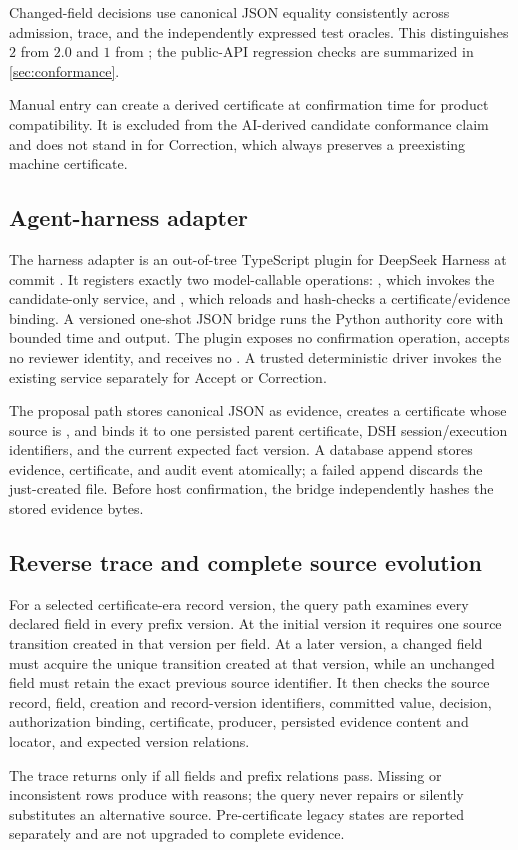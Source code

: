Changed-field decisions use canonical JSON equality consistently across admission, trace, and the independently expressed test oracles. This distinguishes $2$ from $2.0$ and $1$ from ; the public-API regression checks are summarized in \cref{sec:conformance}.

Manual entry can create a derived certificate at confirmation time for product compatibility. It is excluded from the AI-derived candidate conformance claim and does not stand in for Correction, which always preserves a preexisting machine certificate.

\subsection{Agent-harness adapter}

The harness adapter is an out-of-tree TypeScript plugin for DeepSeek Harness  at commit . It registers exactly two model-callable operations: , which invokes the candidate-only service, and , which reloads and hash-checks a certificate/evidence binding. A versioned one-shot JSON bridge runs the Python authority core with bounded time and output. The plugin exposes no confirmation operation, accepts no reviewer identity, and receives no . A trusted deterministic driver invokes the existing  service separately for Accept or Correction.

The proposal path stores canonical JSON as  evidence, creates a certificate whose source is , and binds it to one persisted parent certificate, DSH session/execution identifiers, and the current expected fact version. A database append stores evidence, certificate, and audit event atomically; a failed append discards the just-created file. Before host confirmation, the bridge independently hashes the stored evidence bytes.

\subsection{Reverse trace and complete source evolution}

For a selected certificate-era record version, the query path examines every declared field in every prefix version. At the initial version it requires one source transition created in that version per field. At a later version, a changed field must acquire the unique transition created at that version, while an unchanged field must retain the exact previous source identifier. It then checks the source record, field, creation and record-version identifiers, committed value, decision, authorization binding, certificate, producer, persisted evidence content and locator, and expected version relations.

The trace returns  only if all fields and prefix relations pass. Missing or inconsistent rows produce  with reasons; the query never repairs or silently substitutes an alternative source. Pre-certificate legacy states are reported separately and are not upgraded to complete evidence.
